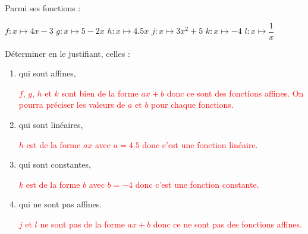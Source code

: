 \begin{corrige}
    Parmi ses fonctions :
    \begin{multicols}{2}
    \begin{itemize}
        \def\item{}
        \item $f:x\longmapsto 4x-3$
        \item $g:x\longmapsto 5-2x$
        \columnbreak
        \item $h:x\longmapsto \num{4.5}{x}$
        \item $j:x\longmapsto 3x^2+5$        
        \item $k:x\longmapsto -4$
        \item $l:x\longmapsto \dfrac{1}{x}$
    \end{itemize}
    \end{multicols}
    Déterminer en le justifiant, celles :

    \begin{enumerate}
        \item qui sont affines,
        
        \textcolor{red}{$f$, $g$, $h$ et $k$ sont bien de la forme $ax+b$ donc ce sont des fonctions affines. On pourra préciser les valeurs de $a$ et $b$ pour chaque fonctions.}
    \end{enumerate}
    \Coupe
    \begin{enumerate}
        \setcounter{enumi}{1}
        \item qui sont linéaires,
        
        \textcolor{red}{$h$ est de la forme $ax$ avec $a=\num{4.5}$ donc c'est une fonction linéaire.}
        \item qui sont constantes,
        
        \textcolor{red}{$k$ est de la forme $b$ avec $b=-4$ donc c'est une fonction constante.}
        \item qui ne sont pas affines.
        
        \textcolor{red}{$j$ et $l$ ne sont pas de la forme $ax+b$ donc ce ne sont pas des fonctions affines.}
    \end{enumerate}
\end{corrige}

